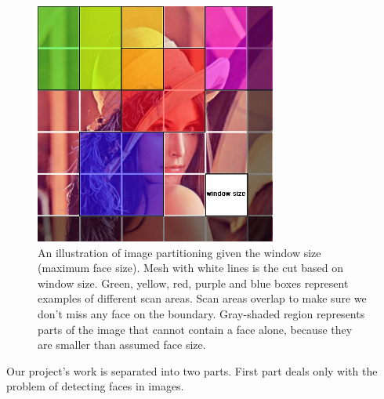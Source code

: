 \documentclass[11pt, draftclsnofoot, onecolumn]{IEEEtran}
\begin{document}
\begin{figure}
\centering
\includegraphics[width=300, height=300]{img1}
\caption{An illustration of image partitioning given the window size (maximum face size). Mesh with white lines is the cut based on window size. Green, yellow, red, purple and blue boxes represent examples of different scan areas. Scan areas overlap to make sure we don't miss any face on the boundary. Gray-shaded region represents parts of the image that cannot contain a face alone, because they are smaller than assumed face size.}
\end{figure}

Our project's work is separated into two parts. First part deals only with the problem of detecting faces in images.
\end{document}
